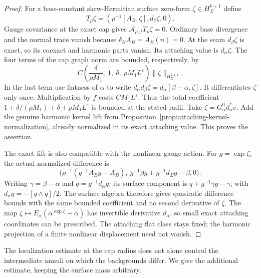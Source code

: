 \documentclass[11pt]{amsart}
\theoremstyle{definition}
\theoremstyle{remark}
\theoremstyle{plain}
\begin{document}
\begin{proof}
For a base-constant skew-Hermitian surface zero-form
$\zeta\in H^{k+1}_\Sigma$ define
\[
 T_\rho\zeta=(\rho^{-1}[A_B,\zeta],d_\beta\zeta,0).
\]
Gauge covariance at the exact cap gives
$\mathcal A_{\rho,f}T_\rho\zeta=0$. Ordinary base divergence and
the normal trace vanish because $\delta_B A_B=A_B(n)=0$.
At the seam $d_\beta\zeta$ is exact, so its coexact and harmonic
parts vanish. Its attaching value is $d_\alpha\zeta$. The four
terms of the cap graph norm are bounded, respectively, by
\[
 C\left(\frac\delta{\rho M_1},\ 1,\ \delta,\
                      \rho M_1L^\varepsilon\right)
                              \|\zeta\|_{H^{k+1}_\Sigma}.
\]
In the last term use flatness of $\alpha$ to write
$d_\alpha d_\beta\zeta=d_\alpha[\beta-\alpha,\zeta]$.
It differentiates $\zeta$ only once. Multiplication by $f$ costs
$CM_1L^\varepsilon$. Thus the total coefficient
$1+\delta/(\rho M_1)+\delta+\rho M_1L^\varepsilon$ is bounded
at the stated radii. Take $\zeta=G^0_\alpha d_\alpha^*e$.
Add the genuine harmonic kernel lift from
Proposition~\ref{prop:attaching-kernel-normalization}, already
normalized in its exact attaching value. This proves the assertion.

The exact lift is also compatible with the nonlinear gauge action.
For $g=\exp\zeta$, the actual normalized difference is
\[
 \bigl(\rho^{-1}(g^{-1}A_Bg-A_B),\
                     g^{-1}\beta g+g^{-1}d_\Sigma g-\beta,0\bigr).
\]
Writing $\gamma=\beta-\alpha$ and $q=g^{-1}d_\alpha g$, its
surface component is $q+g^{-1}\gamma g-\gamma$, with
$d_\alpha q=-[q\wedge q]/2$. The surface algebra therefore gives
quadratic difference bounds with the same bounded coefficient and
no second derivative of $\zeta$. The map
$\zeta\mapsto E_\alpha(\alpha^{\exp\zeta}-\alpha)$ has
invertible derivative $d_\alpha$, so small exact attaching coordinates
can be prescribed. The attaching flat class stays fixed; the harmonic
projection of a finite nonlinear displacement need not vanish.
\end{proof}

The localization estimate at the cap radius does not alone control
the intermediate annuli on which the backgrounds differ. We give the
additional estimate, keeping the surface mass arbitrary.
\end{document}
